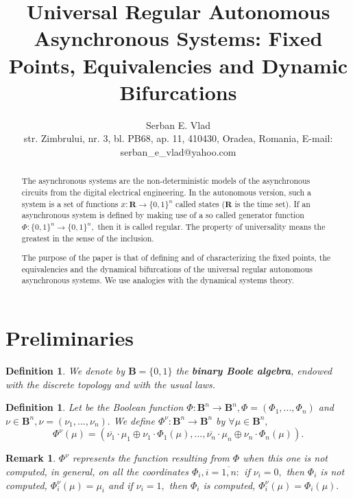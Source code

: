 \documentclass[12pt]{article}\usepackage{amsmath}
\newtheorem{definition}[theorem]{Definition}
\newtheorem{remark}[theorem]{Remark}
\begin{document}
\title{Universal Regular Autonomous Asynchronous Systems: Fixed Points, Equivalencies
and Dynamic Bifurcations}
\author{Serban E. Vlad\\str. Zimbrului, nr. 3, bl. PB68, ap. 11, 410430, Oradea, Romania, E-mail: serban\_e\_vlad@yahoo.com}
\maketitle

\begin{abstract}
The asynchronous systems are the non-deterministic models of the asynchronous
circuits from the digital electrical engineering. In the autonomous version,
such a system is a set of functions $x:\mathbf{R}\rightarrow\{0,1\}^{n}$
called states ($\mathbf{R}$ is the time set). If an asynchronous system is
defined by making use of a so called generator function $\Phi:\{0,1\}^{n}\rightarrow\{0,1\}^{n},$ then it is called regular. The property of
universality means the greatest in the sense of the inclusion.

The purpose of the paper is that of defining and of characterizing the fixed
points, the equivalencies and the dynamical bifurcations of the universal
regular autonomous asynchronous systems. We use analogies with the dynamical
systems theory.

\end{abstract}

\section{Preliminaries}

\begin{definition}
We denote by $\mathbf{B}=\{0,1\}$ the \textbf{binary Boole algebra}, endowed
with the discrete topology and with the usual laws.
\end{definition}

\begin{definition}
Let be the Boolean function $\Phi:\mathbf{B}^{n}\rightarrow\mathbf{B}^{n},\Phi=(\Phi_{1},...,\Phi_{n})$ and $\nu\in\mathbf{B}^{n},\nu=(\nu_{1},...,\nu_{n}).$ We define $\Phi^{\nu}:\mathbf{B}^{n}\rightarrow\mathbf{B}^{n}$
by $\forall\mu\in\mathbf{B}^{n},$\[
\Phi^{\nu}(\mu)=(\overline{\nu_{1}}\cdot\mu_{1}\oplus\nu_{1}\cdot\Phi_{1}(\mu),...,\overline{\nu_{n}}\cdot\mu_{n}\oplus\nu_{n}\cdot\Phi_{n}(\mu)).
\]

\end{definition}

\begin{remark}
$\Phi^{\nu}$ represents the function resulting from $\Phi$ when this one is
not computed, in general, on all the coordinates $\Phi_{i},i=\overline{1,n}:$
if $\nu_{i}=0,$ then $\Phi_{i}$ is not computed, $\Phi_{i}^{\nu}(\mu)=\mu_{i}$
and if $\nu_{i}=1,$ then $\Phi_{i}$ is computed, $\Phi_{i}^{\nu}(\mu)=\Phi
_{i}(\mu).$
\end{remark}
\end{document}
